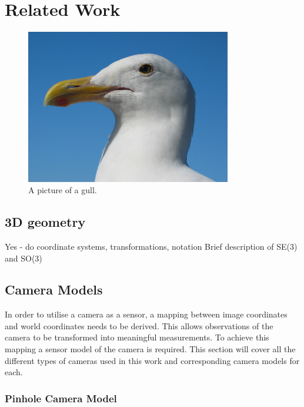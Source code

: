 \chapter{Related Work}
\label{chapter:Related_Work}

\begin{figure}[h!]
  \centering
    \includegraphics[width=0.8\textwidth]{chapters/images/gull}
  \caption{A picture of a gull.}
\end{figure}

\section{3D geometry}

Yes  - do coordinate systems, transformations, notation
Brief description of SE(3) and SO(3)

\section{Camera Models}

In order to utilise a camera as a sensor, a mapping between image coordinates and world
coordinates needs to be derived.  This allows observations of the camera to be transformed into
meaningful measurements.  To achieve this mapping a sensor model of the camera is required. This
section will cover all the different types of cameras used in this work and corresponding camera
models for each. 

\subsection{Pinhole Camera Model}
\label{subsec:pinhole_cam}


